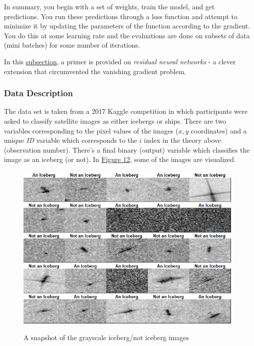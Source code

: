 \documentclass{article}
\begin{document}
\noindent In summary, you begin with a set of weights, train the model, and get predictions. You run these predictions through a loss function and attempt to minimize it by updating the parameters of the function according to the gradient. You do this at some learning rate and the evaluations are done on subsets of data (mini batches) for some number of iterations.

\noindent In this \hyperref[sec:resnn]{subsection}, a primer is provided on \textit{residual neural networks} - a clever extension that circumvented the vanishing gradient problem.


\subsubsection{Data Description}

\noindent The data set is taken from a 2017 Kaggle competition \cite{iceberg} in which participants were asked to classify satellite images as either icebergs or ships. There are two variables corresponding to the pixel values of the images ($x, y$ coordinates) and a unique \textit{ID} variable which corresponds to the $i$ index in the theory above (observation number). There's a final binary (output) variable which classifies the image as an iceberg (or not). In \hyperref[fig:iceberg_images]{Figure 12}, some of the images are visualized.

\begin{figure}[h!]
\centering
  \includegraphics[scale = 0.55]{iceberg_img.png}
  \label{fig:iceberg_images}
  \caption{A snapshot of the grayscale iceberg/not iceberg images}
\end{figure}
\end{document}

